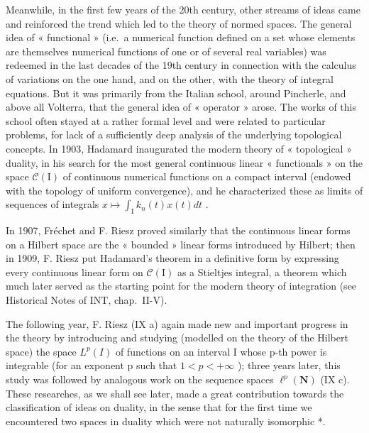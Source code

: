 Meanwhile, in the first few years of the 20th century, other streams of ideas came and reinforced the trend which led to the theory of normed spaces. The general idea of « functional » (i.e.~a numerical function defined on a set whose elements are themselves numerical functions of one or of several real variables) was redeemed in the last decades of the 19th century in connection with the calculus of variations on the one hand, and on the other, with the theory of integral equations. But it was primarily from the Italian school, around Pincherle, and above all Volterra, that the general idea of « operator » arose. The works of this school often stayed at a rather formal level and were related to particular problems, for lack of a sufficiently deep analysis of the underlying topological concepts. In 1903, Hadamard inaugurated the modern theory of « topological » duality, in his search for the most general continuous linear « functionals » on the space \(\mathcal{C}(\mathrm{I})\) of continuous numerical functions on a compact interval (endowed with the topology of uniform convergence), and he characterized these as limits of sequences of integrals \(x\mapsto \int_{\mathrm{I}}k_n(t)x(t)dt\) .

In 1907, Fréchet and F. Riesz proved similarly that the continuous linear forms on a Hilbert space are the « bounded » linear forms introduced by Hilbert; then in 1909, F. Riesz put Hadamard's theorem in a definitive form by expressing every continuous linear form on \(\mathcal{C}(\mathrm{I})\) as a Stieltjes integral, a theorem which much later served as the starting point for the modern theory of integration (see Historical Notes of INT, chap.~II-V).

The following year, F. Riesz (IX a) again made new and important progress in the theory by introducing and studying (modelled on the theory of the Hilbert space) the space \(L^{p}(I)\) of functions on an interval I whose p-th power is integrable (for an exponent p such that \(1 < p < +\infty\) ); three years later, this study was followed by analogous work on the sequence spaces \(\ell^{p}(\mathbf{N})\) (IX c). These researches, as we shall see later, made a great contribution towards the classification of ideas on duality, in the sense that for the first time we encountered two spaces in duality which were not naturally isomorphic *.

